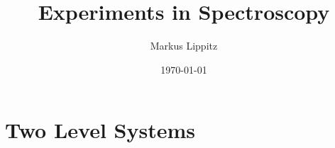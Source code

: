 \documentclass[notoc,nofonts,a4paper,oneside,nobib]{tufte-book}
\begin{document}
\title{Experiments in Spectroscopy}

\author{Markus Lippitz}
\date{\today}


\maketitle



\tableofcontents
%
%
%
%
%
%
%
%
%
%
%
%
%
%
%
%
%
%
%
%
%
\part{Two Level Systems}

%


%



%
%
%
%
%
%
%
%
%
%
%



\printbibliography
\end{document}
